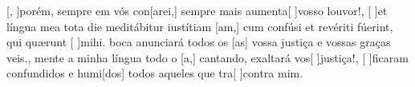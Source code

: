{    {[, ]{po}rém, sempre em vós con[arei,] sempre mais aumenta[ ]{vos}{so} louvor!},
  {[ ]{et} língua mea tota die meditábitur iustítiam [am,] cum confúsi et revériti fúerint, qui quærunt [ ]{mi}hi.}%
    { boca anunciará todos os [as] vossa justiça e vossas graças veis.},
  {}%
    {mente a minha língua todo o [a,] cantando, exaltará vos[ ]{jus}{ti}ça!},
  {}%
    {[ ]{fi}caram confundidos e humi[dos] todos aqueles que tra[ ]{con}tra mim.}
}